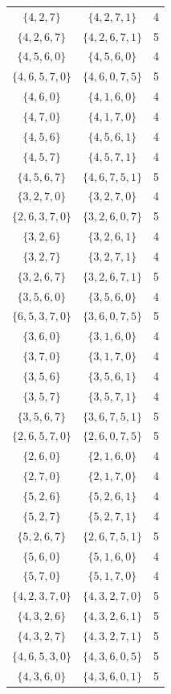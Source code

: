 \begin{longtable}{|c|c|c|}
	$\{4,2,7\}$ & $\{4,2,7,1\}$ & 4 \\
	$\{4,2,6,7\}$ & $\{4,2,6,7,1\}$ & 5 \\
	$\{4,5,6,0\}$ & $\{4,5,6,0\}$ & 4 \\
	$\{4,6,5,7,0\}$ & $\{4,6,0,7,5\}$ & 5 \\
	$\{4,6,0\}$ & $\{4,1,6,0\}$ & 4 \\
	$\{4,7,0\}$ & $\{4,1,7,0\}$ & 4 \\
	$\{4,5,6\}$ & $\{4,5,6,1\}$ & 4 \\
	$\{4,5,7\}$ & $\{4,5,7,1\}$ & 4 \\
	$\{4,5,6,7\}$ & $\{4,6,7,5,1\}$ & 5 \\
	$\{3,2,7,0\}$ & $\{3,2,7,0\}$ & 4 \\
	$\{2,6,3,7,0\}$ & $\{3,2,6,0,7\}$ & 5 \\
	$\{3,2,6\}$ & $\{3,2,6,1\}$ & 4 \\
	$\{3,2,7\}$ & $\{3,2,7,1\}$ & 4 \\
	$\{3,2,6,7\}$ & $\{3,2,6,7,1\}$ & 5 \\
	$\{3,5,6,0\}$ & $\{3,5,6,0\}$ & 4 \\
	$\{6,5,3,7,0\}$ & $\{3,6,0,7,5\}$ & 5 \\
	$\{3,6,0\}$ & $\{3,1,6,0\}$ & 4 \\
	$\{3,7,0\}$ & $\{3,1,7,0\}$ & 4 \\
	$\{3,5,6\}$ & $\{3,5,6,1\}$ & 4 \\
	$\{3,5,7\}$ & $\{3,5,7,1\}$ & 4 \\
	$\{3,5,6,7\}$ & $\{3,6,7,5,1\}$ & 5 \\
	$\{2,6,5,7,0\}$ & $\{2,6,0,7,5\}$ & 5 \\
	$\{2,6,0\}$ & $\{2,1,6,0\}$ & 4 \\
	$\{2,7,0\}$ & $\{2,1,7,0\}$ & 4 \\
	$\{5,2,6\}$ & $\{5,2,6,1\}$ & 4 \\
	$\{5,2,7\}$ & $\{5,2,7,1\}$ & 4 \\
	$\{5,2,6,7\}$ & $\{2,6,7,5,1\}$ & 5 \\
	$\{5,6,0\}$ & $\{5,1,6,0\}$ & 4 \\
	$\{5,7,0\}$ & $\{5,1,7,0\}$ & 4 \\
	$\{4,2,3,7,0\}$ & $\{4,3,2,7,0\}$ & 5 \\
	$\{4,3,2,6\}$ & $\{4,3,2,6,1\}$ & 5 \\
	$\{4,3,2,7\}$ & $\{4,3,2,7,1\}$ & 5 \\
	$\{4,6,5,3,0\}$ & $\{4,3,6,0,5\}$ & 5 \\
	$\{4,3,6,0\}$ & $\{4,3,6,0,1\}$ & 5 \\

\end{longtable}
